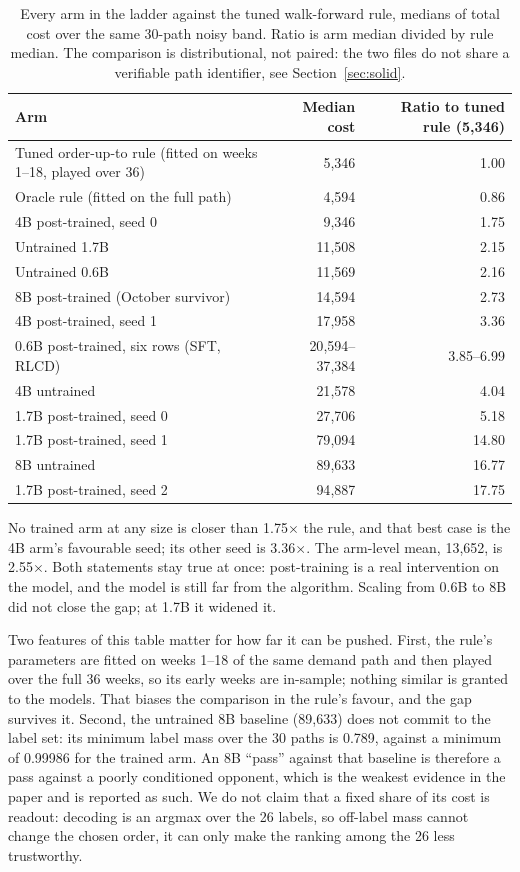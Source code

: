 \documentclass[11pt]{article}
\begin{document}
\begin{table}[ht]
\centering
\caption{Every arm in the ladder against the tuned walk-forward rule, medians of total cost over the
same 30-path noisy band. Ratio is arm median divided by rule median. The comparison is distributional,
not paired: the two files do not share a verifiable path identifier, see Section~\ref{sec:solid}.}
\label{tab:formula}
\small
\begin{tabular}{@{}lrr@{}}
\toprule
Arm & Median cost & Ratio to tuned rule (5{,}346) \\
\midrule
Tuned order-up-to rule (fitted on weeks 1--18, played over 36) & 5{,}346 & 1.00 \\
Oracle rule (fitted on the full path) & 4{,}594 & 0.86 \\
\midrule
4B post-trained, seed 0 & 9{,}346 & 1.75 \\
Untrained 1.7B & 11{,}508 & 2.15 \\
Untrained 0.6B & 11{,}569 & 2.16 \\
8B post-trained (October survivor) & 14{,}594 & 2.73 \\
4B post-trained, seed 1 & 17{,}958 & 3.36 \\
0.6B post-trained, six rows (SFT, RLCD) & 20{,}594--37{,}384 & 3.85--6.99 \\
4B untrained & 21{,}578 & 4.04 \\
1.7B post-trained, seed 0 & 27{,}706 & 5.18 \\
1.7B post-trained, seed 1 & 79{,}094 & 14.80 \\
8B untrained & 89{,}633 & 16.77 \\
1.7B post-trained, seed 2 & 94{,}887 & 17.75 \\
\bottomrule
\end{tabular}
\end{table}

No trained arm at any size is closer than 1.75$\times$ the rule, and that best case is the 4B arm's
favourable seed; its other seed is 3.36$\times$. The arm-level mean, 13{,}652, is 2.55$\times$. Both
statements stay true at once: post-training is a real intervention on the model, and the model is
still far from the algorithm. Scaling from 0.6B to 8B did not close the gap; at 1.7B it widened it.

Two features of this table matter for how far it can be pushed. First, the rule's parameters are
fitted on weeks 1--18 of the same demand path and then played over the full 36 weeks, so its early
weeks are in-sample; nothing similar is granted to the models. That biases the comparison in the
rule's favour, and the gap survives it. Second, the untrained 8B baseline (89{,}633) does not commit to the label set: its minimum label mass
over the 30 paths is 0.789, against a minimum of 0.99986 for the trained arm. An 8B ``pass''
against that baseline is therefore a pass against a poorly conditioned opponent, which is the weakest
evidence in the paper and is reported as such. We do not claim that a fixed share of its cost is
readout: decoding is an argmax over the 26 labels, so off-label mass cannot change the chosen order,
it can only make the ranking among the 26 less trustworthy.
\end{document}
